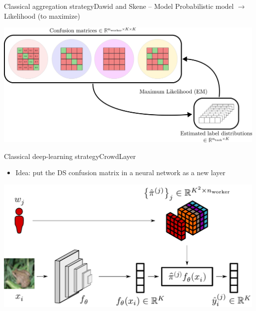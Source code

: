 \begin{frame}{Classical aggregation strategy}{Dawid and Skene -- Model}
Probabilistic model $\longrightarrow$ Likelihood (to maximize)
\begin{center}
\includegraphics[width=.75\textwidth]{./images/DS_EM.pdf}
\end{center}
\end{frame}

\begin{frame}{Classical deep-learning strategy}{CrowdLayer}
    \begin{itemize}
        \item Idea: put the DS confusion matrix in a neural network as a new layer
    \end{itemize}

    \begin{center}
        \includegraphics[width=\textwidth]{./images/crowdlayer_scheme.pdf}
    \end{center}
\end{frame}

